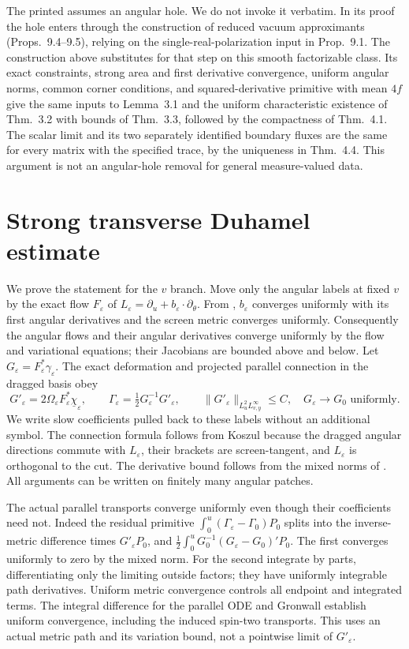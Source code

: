 \documentclass[11pt]{article}
\newcommand{\eps}{\varepsilon}
\begin{document}
The printed \cite[Thm.~4.7]{LR} assumes an angular hole. We do not invoke it verbatim. In its proof the hole enters through the construction of reduced vacuum approximants (Props.~9.4--9.5), relying on the single-real-polarization input in Prop.~9.1. The construction above substitutes for that step on this smooth factorizable class. Its exact constraints, strong area and first derivative convergence, uniform angular norms, common corner conditions, and squared-derivative primitive with mean $4f$ give the same inputs to Lemma~3.1 and the uniform characteristic existence of Thm.~3.2 with bounds of Thm.~3.3, followed by the compactness of Thm.~4.1. The scalar limit and its two separately identified boundary fluxes are the same for every matrix with the specified trace, by the uniqueness in Thm.~4.4. This argument is not an angular-hole removal for general measure-valued data.

\section{Strong transverse Duhamel estimate}
We prove the statement for the $v$ branch. Move only the angular labels at fixed $v$ by the exact flow $F_\eps$ of $L_\eps=\partial_u+b_\eps\cdot\partial_\theta$. From \cite[Props.~6.2, 6.8]{LR}, $b_\eps$ converges uniformly with its first angular derivatives and the screen metric converges uniformly. Consequently the angular flows and their angular derivatives converge uniformly by the flow and variational equations; their Jacobians are bounded above and below. Let $G_\eps=F_\eps^*\gamma_\eps$. The exact deformation and projected parallel connection in the dragged basis obey
\[
 G'_\eps=2\Omega_\eps F_\eps^*\underline\chi_\eps,\qquad
 \Gamma_\eps=\tfrac12 G_\eps^{-1}G'_\eps,\qquad
 \|G'_\eps\|_{L^2_uL^\infty_{v,y}}\leq C,
 \quad G_\eps\to G_0\text{ uniformly}.
\]
We write slow coefficients pulled back to these labels without an additional symbol. The connection formula follows from Koszul because the dragged angular directions commute with $L_\eps$, their brackets are screen-tangent, and $L_\eps$ is orthogonal to the cut. The derivative bound follows from the mixed norms of \cite[(3.12)--(3.13)]{LR}. All arguments can be written on finitely many angular patches.

The actual parallel transports converge uniformly even though their coefficients need not. Indeed the residual primitive $\int_0^u(\Gamma_\eps-\Gamma_0)P_0$ splits into the inverse-metric difference times $G'_\eps P_0$, and $\frac12\int_0^uG_0^{-1}(G_\eps-G_0)'P_0$. The first converges uniformly to zero by the mixed norm. For the second integrate by parts, differentiating only the limiting outside factors; they have uniformly integrable path derivatives. Uniform metric convergence controls all endpoint and integrated terms. The integral difference for the parallel ODE and Gronwall establish uniform convergence, including the induced spin-two transports. This uses an actual metric path and its variation bound, not a pointwise limit of $G'_\eps$.
\end{document}
